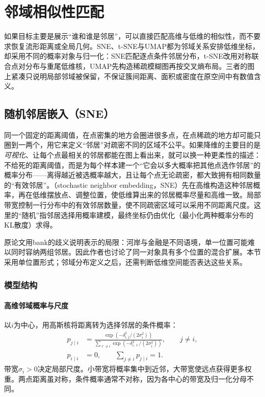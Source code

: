 \section{邻域相似性匹配}
\label{sec:dim-neighbors}

如果目标主要是展示“谁和谁是邻居”，可以直接匹配高维与低维的相似性，而不要求恢复流形距离或全局几何。SNE、t-SNE与UMAP都为邻域关系安排低维坐标，却采用不同的概率对象与归一化：SNE匹配逐点条件邻居分布，t-SNE改用对称联合点对分布与重尾低维核，UMAP先构造稀疏模糊图再按交叉熵布局。三者的图上紧凑只说明局部邻域被保留，不保证簇间距离、面积或密度在原空间中有数值含义。

\subsection{随机邻居嵌入（SNE）}
\label{sec:dim-sne}

同一个固定的距离阈值，在点密集的地方会圈进很多点，在点稀疏的地方却可能只圈到一两个，用它来定义“邻居”对疏密不同的区域不公平。如果降维的主要目的是\emph{可视化}、让每个点最相关的邻居都能在图上看出来，就可以换一种更柔性的描述：不给死的距离阈值，而是为每个样本建一个“它会以多大概率把其他点选作邻居”的概率分布——离得越近被选概率越大，且让每个点无论疏密，都大致拥有相同数量的“有效邻居”。（stochastic neighbor embedding，SNE）先在高维构造这种邻居概率，再在低维摆放点、调整位置，使低维算出来的邻居概率尽量和高维一致。局部带宽控制一行分布中的有效邻居数量，使不同疏密区域可以采用不同距离尺度。这里的“随机”指邻居选择用概率建模，最终坐标仍由优化（最小化两种概率分布的KL散度）求得。

原论文用bank的歧义说明表示的局限：河岸与金融是不同语境，单一位置可能难以同时容纳两组邻居。因此作者也讨论了同一对象具有多个位置的混合扩展。本节采用单位置形式；邻域分布定义之后，还需判断低维空间能否表达这些关系。

\subsubsection{模型结构}

\paragraph{高维邻域概率与尺度}

以$i$为中心，用高斯核将距离转为选择邻居的条件概率：
\begin{equation}
  \label{eq:dim-sne-high}
  \begin{aligned}
    p_{j\mid i}
      &=\frac{\exp(-\delta_{i,j}^2/(2\sigma_i^2))}
      {\sum_{\ell\ne i}\exp(-\delta_{i,\ell}^2/(2\sigma_i^2))},
      \qquad j\ne i,\\
    p_{i\mid i}&=0,\qquad \sum_{j\ne i}p_{j\mid i}=1.
  \end{aligned}
\end{equation}
带宽$\sigma_i>0$决定局部尺度。小带宽将概率集中到近邻，大带宽使远点获得更多权重。两点距离虽对称，条件概率通常不对称，因为各中心的带宽及归一化分母不同。

